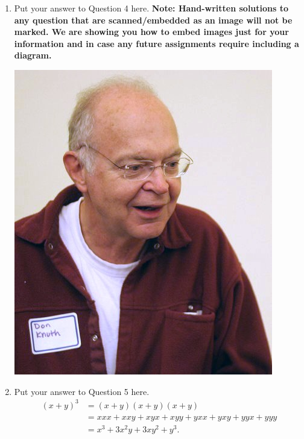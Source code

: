 \documentclass{article}
\begin{document}
\begin{enumerate}
    \item Put your answer to Question 4 here.
    {\bf \textcolor{red!90!black}{Note: Hand-written solutions to any question that are scanned/embedded as an image will not be marked. We are showing you how to embed images just for your information and in case any future assignments require including a diagram.}}
    
    \begin{center}
        \includegraphics[scale=0.25]{Knuth.jpg}
    \end{center}
    
    \item Put your answer to Question 5 here.
    \begin{align}
        (x+y)^3 &= (x+y)(x+y)(x+y) \\
                &= xxx + xxy + xyx + xyy + yxx + yxy + yyx + yyy \\
                &= x^{3} + 3x^{2}y + 3xy^{2} + y^{3}.
    \end{align}
    

\end{enumerate}
\end{document}
